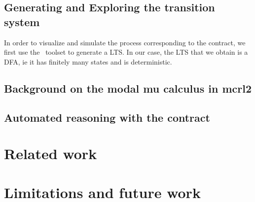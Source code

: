 \documentclass{article}
\begin{document}


\subsection{Generating and Exploring the transition system}
In order to visualize and simulate the process corresponding to the contract,
we first use the \mcrl \, toolset to generate a LTS.
In our case, the LTS that we obtain is a DFA, ie it has finitely many states
and is deterministic.

\subsection{Background on the modal mu calculus in mcrl2}

\subsection{Automated reasoning with the contract}

\section{Related work}

\section{Limitations and future work}
\end{document}
